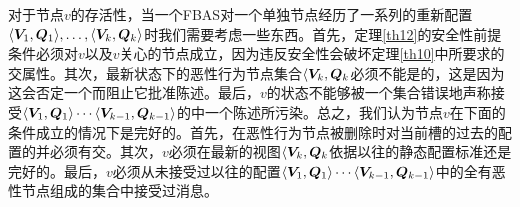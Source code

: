 对于节点$v$的存活性，当一个FBAS对一个单独节点经历了一系列的重新配置$\langle {\bm V_1},{\bm Q_1}\rangle,\ldots,\langle {\bm V_k},{\bm Q_k}\rangle$时我们需要考虑一些东西。首先，定理\ref{th12}的安全性前提条件必须对$v$以及$v$关心的节点成立，因为违反安全性会破坏定理\ref{th10}中所要求的{\quorum}交属性。其次，最新状态下的恶性行为节点集合$\langle {\bm V_k}, {\bm Q_k}$必须不能是{\vblock}的，这是因为这会否定一个{\quorum}而阻止它批准陈述。最后，$v$的状态不能够被一个{\vblock}集合错误地声称接受$\langle {\bm V_1},{\bm Q_1}\rangle\cdots \langle {\bm V_{k-1},{\bm Q_{k-1}}\rangle}$的中一个陈述所污染。总之，我们认为节点$v$在下面的条件成立的情况下是完好的。首先，在恶性行为节点被删除时对当前槽的过去的配置的并必须有{\quorum}交。其次，$v$必须在最新的视图$\langle {\bm V_k}, {\bm Q_k}$依据以往的静态配置标准还是完好的。最后，$v$必须从未接受过以往的配置$\langle {\bm V_1},{\bm Q_1}\rangle\cdots \langle {\bm V_{k-1},{\bm Q_{k-1}}\rangle}$中的全有恶性节点组成的{\vblock}集合中接受过消息。